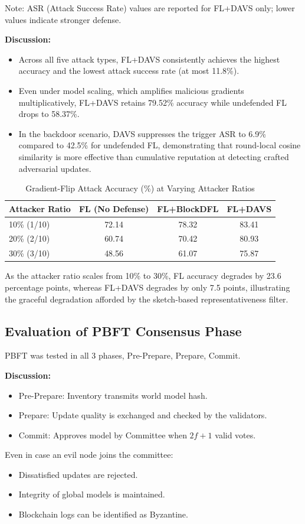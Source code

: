 \documentclass[12pt,a4paper]{article}
\begin{document}
Note: ASR (Attack Success Rate) values are reported for FL+DAVS only; lower values indicate stronger defense.

\textbf{Discussion:}
\begin{itemize}
    \item Across all five attack types, FL+DAVS consistently achieves the highest accuracy and the lowest attack success rate (at most 11.8\%).
    \item Even under model scaling, which amplifies malicious gradients multiplicatively, FL+DAVS retains 79.52\% accuracy while undefended FL drops to 58.37\%.
    \item In the backdoor scenario, DAVS suppresses the trigger ASR to 6.9\% compared to 42.5\% for undefended FL, demonstrating that round-local cosine similarity is more effective than cumulative reputation at detecting crafted adversarial updates.
\end{itemize}

\begin{table}[h]
\centering
\caption{Gradient-Flip Attack Accuracy (\%) at Varying Attacker Ratios}
\begin{tabular}{|l|c|c|c|}
\hline
\textbf{Attacker Ratio} & \textbf{FL (No Defense)} & \textbf{FL+BlockDFL} & \textbf{FL+DAVS} \\ \hline
10\% (1/10) & 72.14 & 78.32 & 83.41 \\ \hline
20\% (2/10) & 60.74 & 70.42 & 80.93 \\ \hline
30\% (3/10) & 48.56 & 61.07 & 75.87 \\ \hline
\end{tabular}
\end{table}
As the attacker ratio scales from 10\% to 30\%, FL accuracy degrades by 23.6 percentage points, whereas FL+DAVS degrades by only 7.5 points, illustrating the graceful degradation afforded by the sketch-based representativeness filter.

\subsection{Evaluation of PBFT Consensus Phase}
PBFT was tested in all 3 phases, Pre-Prepare, Prepare, Commit.

\textbf{Discussion:}
\begin{itemize}
    \item Pre-Prepare: Inventory transmits world model hash.
    \item Prepare: Update quality is exchanged and checked by the validators.
    \item Commit: Approves model by Committee when $2f + 1$ valid votes.
\end{itemize}
Even in case an evil node joins the committee:
\begin{itemize}
    \item Dissatisfied updates are rejected.
    \item Integrity of global models is maintained.
    \item Blockchain logs can be identified as Byzantine.
\end{itemize}
\end{document}
